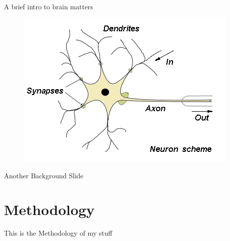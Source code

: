 \documentclass[12pt]{beamer}
\begin{document}
\begin{frame}{\sc A brief intro to brain matters}
\begin{center}

\begin{figure}[ht]
\includegraphics[scale=1]{figures/neuron.png}
\end{figure}

\end{center}
\end{frame}




\begin{frame}{\sc Another Background Slide}
\begin{center}




\end{center}
\end{frame}





\section{\sc Methodology}

\begin{frame}{\sc This is the Methodology of my stuff}

\end{frame}

\end{document}
